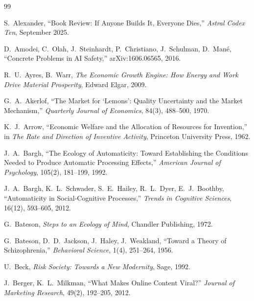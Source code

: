 
\begin{thebibliography}{99}

S.~Alexander, ``Book Review: If Anyone Builds It, Everyone Dies,'' \textit{Astral Codex Ten}, September 2025.

D.~Amodei, C.~Olah, J.~Steinhardt, P.~Christiano, J.~Schulman, D.~Mané, ``Concrete Problems in AI Safety,'' arXiv:1606.06565, 2016.

R.~U.~Ayres, B.~Warr, \textit{The Economic Growth Engine: How Energy and Work Drive Material Prosperity}, Edward Elgar, 2009.

G.~A.~Akerlof, ``The Market for `Lemons': Quality Uncertainty and the Market Mechanism,'' \textit{Quarterly Journal of Economics}, 84(3), 488--500, 1970.

K.~J.~Arrow, ``Economic Welfare and the Allocation of Resources for Invention,'' in \textit{The Rate and Direction of Inventive Activity}, Princeton University Press, 1962.

J.~A.~Bargh, ``The Ecology of Automaticity: Toward Establishing the Conditions Needed to Produce Automatic Processing Effects,'' \textit{American Journal of Psychology}, 105(2), 181--199, 1992.

J.~A.~Bargh, K.~L.~Schwader, S.~E.~Hailey, R.~L.~Dyer, E.~J.~Boothby, ``Automaticity in Social-Cognitive Processes,'' \textit{Trends in Cognitive Sciences}, 16(12), 593--605, 2012.

G.~Bateson, \textit{Steps to an Ecology of Mind}, Chandler Publishing, 1972.

G.~Bateson, D.~D.~Jackson, J.~Haley, J.~Weakland, ``Toward a Theory of Schizophrenia,'' \textit{Behavioral Science}, 1(4), 251--264, 1956.

U.~Beck, \textit{Risk Society: Towards a New Modernity}, Sage, 1992.

J.~Berger, K.~L.~Milkman, ``What Makes Online Content Viral?'' \textit{Journal of Marketing Research}, 49(2), 192--205, 2012.


\end{thebibliography}
